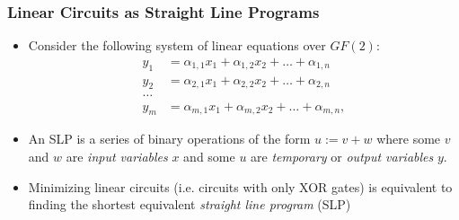 \documentclass[handout,10pt]{beamer}
\begin{document}
\begin{frame}
	\frametitle{Linear Circuits as Straight Line Programs}
	\begin{itemize}
		\item Consider the following system of linear equations over $GF(2)$:
\begin{align*}
y_1 & = \alpha_{1,1}x_1 + \alpha_{1,2}x_2 + \dots + \alpha_{1,n} \\
y_2 & = \alpha_{2,1}x_1 + \alpha_{2,2}x_2 + \dots + \alpha_{2,n} \\
\dots \\
y_m & = \alpha_{m,1}x_1 + \alpha_{m,2}x_2 + \dots + \alpha_{m,n},
\end{align*}
		\item An SLP is a series of binary operations of the form $u := v + w$ where some $v$ and $w$ are \emph{input variables} $x$ and some $u$ are \emph{temporary} or \emph{output variables} $y$.
		\item Minimizing linear circuits (i.e. circuits with only XOR gates) is equivalent to finding the shortest equivalent \emph{straight line program} (SLP)
	\end{itemize}
\end{frame}
\end{document}
